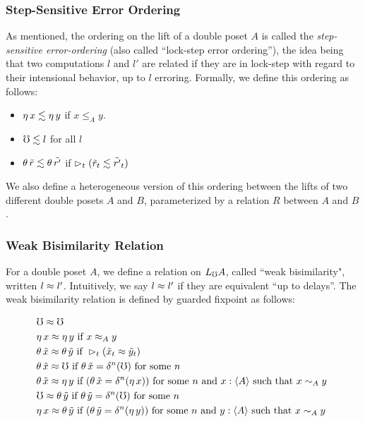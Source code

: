 \subsubsection{Step-Sensitive Error Ordering}\label{subsec:lock-step}

As mentioned, the ordering on the lift of a double poset $A$ is called the
\emph{step-sensitive error-ordering} (also called ``lock-step error ordering''),
the idea being that two computations $l$ and $l'$ are related if they are in
lock-step with regard to their intensional behavior, up to $l$ erroring.
Formally, we define this ordering as follows:

\begin{itemize}
  \item 	$\eta\, x \lesssim \eta\, y$ if $x \le_A y$.
  \item 	$\mho \lesssim l$ for all $l$ 
  \item   $\theta\, \tilde{r} \lesssim \theta\, \tilde{r'}$ if
          $\vartriangleright_t (\tilde{r}_t \lesssim \tilde{r'}_t)$
\end{itemize}

We also define a heterogeneous version of this ordering between the lifts of two
different double posets $A$ and $B$, parameterized by a relation $R$ between $A$ and $B$.

\subsubsection{Weak Bisimilarity Relation}

For a double poset $A$, we define a relation on $L_\mho A$, called ``weak bisimilarity",
written $l \approx l'$. Intuitively, we say $l \approx l'$ if they are equivalent
``up to delays''.
%
The weak bisimilarity relation is defined by guarded fixpoint as follows:

\begin{align*}
  &\mho \bisim \mho \\
%
  &\eta\, x \bisim \eta\, y \text{ if } 
    x \bisim_A y \\
%		
  &\theta\, \tilde{x} \bisim \theta\, \tilde{y} \text{ if } 
    \later_t (\tilde{x}_t \bisim \tilde{y}_t) \\
%	
  &\theta\, \tilde{x} \bisim \mho \text{ if } 
    \theta\, \tilde{x} = \delta^n(\mho) \text { for some $n$ } \\
%	
  &\theta\, \tilde{x} \bisim \eta\, y \text{ if }
    (\theta\, \tilde{x} = \delta^n(\eta\, x))
  \text { for some $n$ and $x : \ty{A}$ such that $x \sim_A y$ } \\
%
  &\mho \bisim \theta\, \tilde{y} \text { if } 
    \theta\, \tilde{y} = \delta^n(\mho) \text { for some $n$ } \\
%	
  &\eta\, x \bisim \theta\, \tilde{y} \text { if }
    (\theta\, \tilde{y} = \delta^n (\eta\, y))
  \text { for some $n$ and $y : \ty{A}$ such that $x \sim_A y$ }
\end{align*}


